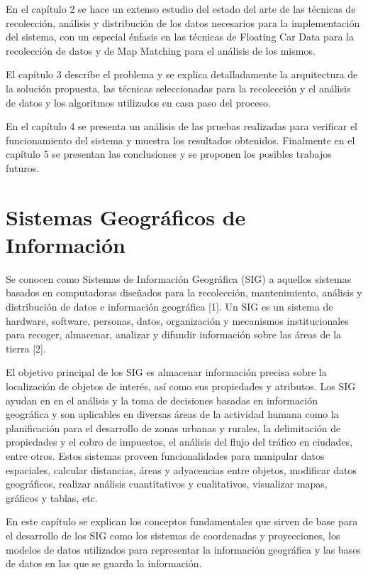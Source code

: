 \documentclass[final,fmstyle]{fpunathesis}
\begin{document}

En el capítulo 2 se hace un extenso estudio del estado del arte de las técnicas de recolección, análisis y distribución de los datos necesarios para la implementación del sistema, con un especial énfasis en las técnicas de Floating Car Data para la recolección de datos y de Map Matching para el análisis de los mismos.

El capítulo 3  describe el problema y se explica detalladamente la arquitectura de la solución propuesta, las técnicas seleccionadas para la recolección y el análisis de datos y los algoritmos utilizados en casa paso del proceso.

En el capítulo 4 se presenta un análisis de las pruebas realizadas para verificar el funcionamiento del sistema y muestra los resultados obtenidos. Finalmente en el capítulo 5 se presentan las conclusiones y se proponen los posibles trabajos futuros.

\chapter{Sistemas Geográficos de Información}

Se conocen como Sistemas de Información Geográfica (SIG) a aquellos sistemas basados en computadoras diseñados para la recolección, mantenimiento, análisis y distribución de datos e información geográfica [1]. Un SIG es un sistema de hardware, software, personas, datos, organización y mecanismos institucionales para recoger, almacenar, analizar y difundir información sobre las áreas de la tierra [2].

El objetivo principal de los SIG es almacenar información precisa sobre la localización de objetos de interés, así como sus propiedades y atributos. Los SIG ayudan en en el análisis y la toma de decisiones basadas en información geográfica y son aplicables en diversas áreas de la actividad humana como la planificación para el desarrollo de zonas urbanas y rurales, la delimitación de propiedades y el cobro de  impuestos, el análisis del flujo del tráfico en ciudades, entre otros. Estos sistemas proveen funcionalidades para manipular datos espaciales, calcular distancias, áreas y adyacencias entre objetos, modificar datos geográficos, realizar análisis cuantitativos y cualitativos, visualizar mapas, gráficos y tablas, etc.

En este capítulo se explican los conceptos fundamentales que sirven de base para el desarrollo de los SIG como los sistemas de coordenadas y proyecciones, los modelos de datos utilizados para representar la información geográfica y las bases de datos en las que se guarda la información.
\end{document}
